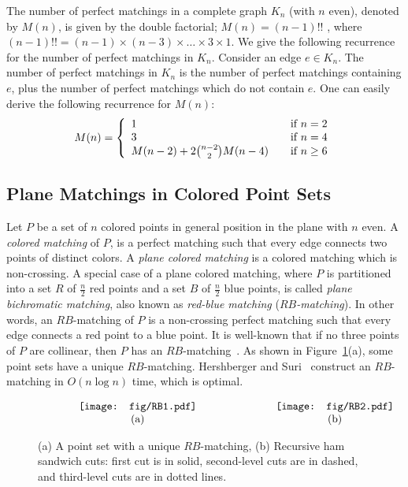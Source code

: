 \documentclass[11pt,a4paper]{article}
\begin{document}
The number of perfect matchings in a complete graph $K_n$ (with $n$ even), denoted by $M(n)$, is given by the double factorial; $M(n)=(n − 1)!!$ \cite{Callan2009}, where $(n-1)!!=\allowbreak (n-1)\times\allowbreak  (n-3)\times\allowbreak \dots\times 3\times 1$. We give the following recurrence for the number of perfect matchings in $K_n$. Consider an edge $e\in K_n$. The number of perfect matchings in $K_n$ is the number of perfect matchings containing $e$, plus the number of perfect matchings which do not contain $e$. One can easily derive the following recurrence for $M(n)$: 
\[ M(n) = \left\{
  \begin{array}{l l}
    1 & \quad \text{if $n=2$}\\
    3 & \quad \text{if $n=4$}\\
  M(n-2)+2{n-2 \choose 2}M(n-4) & \quad \text{if $n\ge 6$}
  \end{array} \right.\]

\subsection{Plane Matchings in Colored Point Sets}
\label{colored-matching-section}
Let $P$ be a set of $n$ colored points in general position in the plane with $n$ even. A {\em colored matching} of $P$, is a perfect matching such that every edge connects two points of distinct colors. A {\em plane colored matching} is a colored matching which is non-crossing.  
A special case of a plane colored matching, where $P$ is partitioned into a set $R$ of $\frac{n}{2}$ red points and a set $B$ of $\frac{n}{2}$ blue points, is called {\em plane bichromatic matching}, also known as {\em red-blue matching} ($RB${\em-matching}). In other words, an $RB$-matching of $P$ is a non-crossing perfect matching such that every edge connects a red point to a blue point. It is well-known that if no three points of $P$ are collinear, then $P$ has an $RB$-matching~\cite{Putnam1979}. As shown in Figure~\ref{RB-fig}(a), some point sets have a unique $RB$-matching. Hershberger and Suri~\cite{Hershberger1992} construct an $RB$-matching in $O(n\log n)$ time, which is optimal.

\begin{figure}[htb]
  \centering
\setlength{\tabcolsep}{0in}
  $\begin{tabular}{cc}
\multicolumn{1}{m{.5\columnwidth}}{\centering\texttt{[image: fig/RB1.pdf]}}
&\multicolumn{1}{m{.5\columnwidth}}{\centering\texttt{[image: fig/RB2.pdf]}} \\
(a) & (b)
\end{tabular}$
  \caption{(a) A point set with a unique $RB$-matching, (b) Recursive ham sandwich cuts: first cut is in solid, second-level cuts are in dashed, and third-level cuts are in dotted lines.}
\label{RB-fig}
\end{figure}
\end{document}
